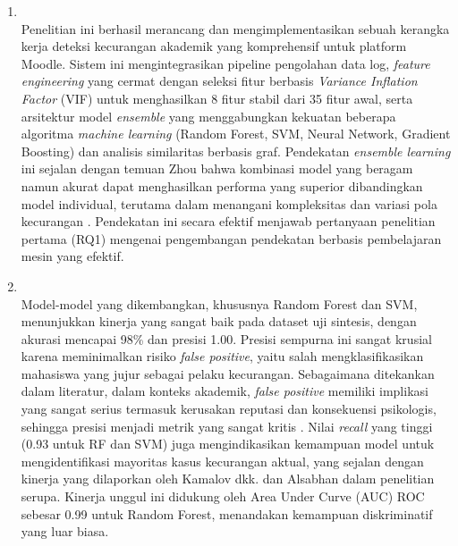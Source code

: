 \begin{enumerate}
    \item {} \\
    Penelitian ini berhasil merancang dan mengimplementasikan sebuah kerangka kerja deteksi kecurangan akademik yang komprehensif untuk platform Moodle. Sistem ini mengintegrasikan pipeline pengolahan data log, \textit{feature engineering} yang cermat dengan seleksi fitur berbasis \textit{Variance Inflation Factor} (VIF) untuk menghasilkan 8 fitur stabil dari 35 fitur awal, serta arsitektur model \textit{ensemble} yang menggabungkan kekuatan beberapa algoritma \textit{machine learning} (Random Forest, SVM, Neural Network, Gradient Boosting) dan analisis similaritas berbasis graf. Pendekatan \textit{ensemble learning} ini sejalan dengan temuan Zhou \cite{Zhou2012} bahwa kombinasi model yang beragam namun akurat dapat menghasilkan performa yang superior dibandingkan model individual, terutama dalam menangani kompleksitas dan variasi pola kecurangan \cite{Chang2023}. Pendekatan ini secara efektif menjawab pertanyaan penelitian pertama (RQ1) mengenai pengembangan pendekatan berbasis pembelajaran mesin yang efektif.

    \item {} \\
    Model-model yang dikembangkan, khususnya Random Forest dan SVM, menunjukkan kinerja yang sangat baik pada dataset uji sintesis, dengan akurasi mencapai 98\% dan presisi 1.00. Presisi sempurna ini sangat krusial karena meminimalkan risiko \textit{false positive}, yaitu salah mengklasifikasikan mahasiswa yang jujur sebagai pelaku kecurangan. Sebagaimana ditekankan dalam literatur, dalam konteks akademik, \textit{false positive} memiliki implikasi yang sangat serius termasuk kerusakan reputasi dan konsekuensi psikologis, sehingga presisi menjadi metrik yang sangat kritis \cite{Ferguson2012}. Nilai \textit{recall} yang tinggi (0.93 untuk RF dan SVM) juga mengindikasikan kemampuan model untuk mengidentifikasi mayoritas kasus kecurangan aktual, yang sejalan dengan kinerja yang dilaporkan oleh Kamalov dkk. \cite{Kamalov2021} dan Alsabhan \cite{Alsabhan2023} dalam penelitian serupa. Kinerja unggul ini didukung oleh Area Under Curve (AUC) ROC sebesar 0.99 untuk Random Forest, menandakan kemampuan diskriminatif yang luar biasa.


\end{enumerate}

